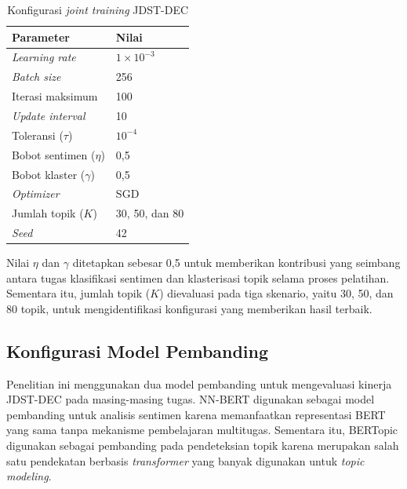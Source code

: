 \begin{table}[H]
    \centering
    \caption{Konfigurasi \textit{joint training} JDST-DEC}
    \label{tab:config_joint}
    \renewcommand{\arraystretch}{1.15}
    \begin{tabular}{L{5.0cm} L{6.5cm}}
        \toprule
        \textbf{Parameter} & \textbf{Nilai} \\
        \midrule
        \textit{Learning rate}   & $1 \times 10^{-3}$ \\
        \textit{Batch size}      & 256 \\
        Iterasi maksimum         & 100 \\
        \textit{Update interval} & 10 \\
        Toleransi ($\tau$)       & $10^{-4}$ \\
        Bobot sentimen ($\eta$)  & 0{,}5 \\
        Bobot klaster ($\gamma$) & 0{,}5 \\
        \textit{Optimizer}       & SGD \\
        Jumlah topik ($K$)       & 30, 50, dan 80 \\
        \textit{Seed}            & 42 \\
        \bottomrule
    \end{tabular}
\end{table}

Nilai $\eta$ dan $\gamma$ ditetapkan sebesar 0{,}5 untuk memberikan kontribusi
yang seimbang antara tugas klasifikasi sentimen dan klasterisasi topik selama
proses pelatihan. Sementara itu, jumlah topik ($K$) dievaluasi pada tiga
skenario, yaitu 30, 50, dan 80 topik, untuk mengidentifikasi konfigurasi yang
memberikan hasil terbaik.

\subsection{Konfigurasi Model Pembanding}

Penelitian ini menggunakan dua model pembanding untuk mengevaluasi kinerja
JDST-DEC pada masing-masing tugas. NN-BERT digunakan sebagai model pembanding
untuk analisis sentimen karena memanfaatkan representasi BERT yang sama tanpa
mekanisme pembelajaran multitugas. Sementara itu, BERTopic digunakan sebagai
pembanding pada pendeteksian topik karena merupakan salah satu pendekatan
berbasis \textit{transformer} yang banyak digunakan untuk \textit{topic modeling}.

